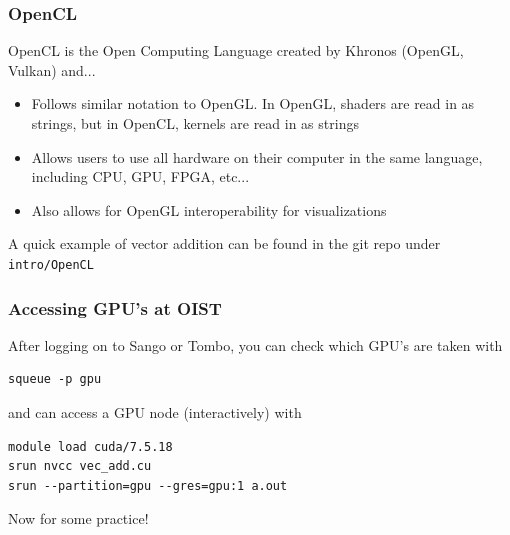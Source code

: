\documentclass{beamer}
\begin{document}
\begin{frame}
\frametitle{OpenCL}

OpenCL is the Open Computing Language created by Khronos (OpenGL, Vulkan) and...

\begin{itemize}
\item Follows similar notation to OpenGL. In OpenGL, shaders are read in as strings, but in OpenCL, kernels are read in as strings
\item Allows users to use all hardware on their computer in the same language, including CPU, GPU, FPGA, etc...
\item Also allows for OpenGL interoperability for visualizations
\end{itemize}

A quick example of vector addition can be found in the git repo under \texttt{intro/OpenCL}
\end{frame}

\begin{frame}[fragile]
\frametitle{Accessing GPU's at OIST}

After logging on to Sango or Tombo, you can check which GPU's are taken with 

\begin{lstlisting}
squeue -p gpu
\end{lstlisting}

and can access a GPU node (interactively) with

\begin{lstlisting}
module load cuda/7.5.18
srun nvcc vec_add.cu
srun --partition=gpu --gres=gpu:1 a.out
\end{lstlisting}


\pause
\vspace{-0.5cm}
\begin{center}
\Huge{Now for some practice!}
\end{center}
\end{frame}
\end{document}
